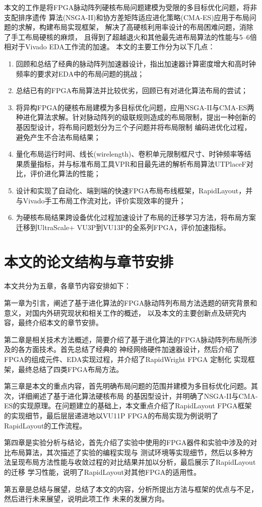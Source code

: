 本文的工作是将FPGA脉动阵列硬核布局问题建模为受限的多目标优化问题，将非支配排序遗传
算法(NSGA-II)和协方差矩阵适应进化策略(CMA-ES)应用于布局问题的求解，构建布局实现框架，
解决了高硬核利用率设计的布局困难问题，消除了手工布局硬核的麻烦，
且得到了超越退火和其他最先进布局算法的性能与5--6倍相对于Vivado EDA工作流的加速。
本文的主要工作分为以下几点：

\begin{enumerate}
    \item 回顾和总结了经典的脉动阵列加速器设计，指出加速器计算密度增大和高时钟频率的要求对EDA中的布局问题的挑战；
    \item 总结已有的FPGA布局算法并比较优劣，回顾已有对进化算法布局的尝试；
    \item 将异构FPGA的硬核布局建模为多目标优化问题，应用NSGA-II与CMA-ES两种进化算法求解。针对脉动阵列的级联规则造成的布局限制，提出一种创新的基因型设计，将布局问题划分为三个子问题并将布局限制
    编码进优化过程，避免产生不合法布局结果；    
    \item 量化布局运行时间、线长(wirelength)、卷积单元限制框尺寸、时钟频率等结果质量指标，并与标准布局工具VPR和目最先进的解析布局算法UTPlaceF对比，评价进化算法的性能；
    \item 设计和实现了自动化、端到端的快速FPGA布局布线框架，RapidLayout，并与Vivado手工布局工作流对比，评价实现效率的提升；
    \item 为硬核布局结果跨设备优化过程加速设计了布局的迁移学习方法，将布局方案迁移到UltraScale+ VU3P到VU13P的全系列FPGA，评价加速指标。
\end{enumerate}




\section{本文的论文结构与章节安排}
\label{sec:arrangement}
本文共分为五章，各章节内容安排如下：

第一章为引言，阐述了基于进化算法的FPGA脉动阵列布局方法选题的研究背景和意义，对国内外研究现状和相关工作的概述，
以及本文的主要创新点及研究内容，最终介绍本文的章节安排。


第二章是相关技术方法概述，简要介绍了基于进化算法的FPGA脉动阵列布局所涉及的各方面技术。首先总结了经典的
神经网络硬件加速器设计，然后介绍了FPGA的组成元件、EDA实现过程，并介绍了RapidWright FPGA 定制化
实现框架，最终总结了四类FPGA布局方法。

第三章是本文的重点内容，首先明确布局问题的范围并建模为多目标优化问题。其次，详细阐述了基于进化算法硬核布局
的基因型设计，并明确了NSGA-II与CMA-ES的实现原理。在问题建立的基础上，本文重点介绍了RapidLayout FPGA框架
的实现细节，最后层层递进地以VU11P FPGA的布局实现为例说明了RapidLayout的工作流程。

第四章是实验分析与结论，首先介绍了实验中使用的FPGA器件和实验中涉及的对比布局算法，其次描述了实验的编程实现与
测试环境等实现细节，然后以多种方法呈现布局方法性能与收敛过程的对比结果并加以分析，最后展示了RapidLayout的迁移
学习性能，说明了RapidLayout对其他FPGA的适用性。

第五章是总结与展望，总结了本文的内容，分析所提出方法与框架的优点与不足，然后进行未来展望，说明此项工作
未来的发展方向。

